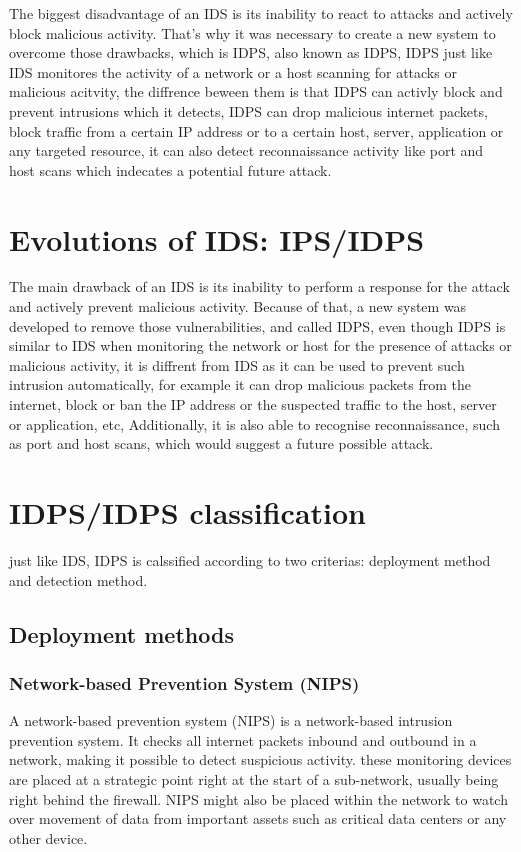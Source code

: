 The biggest disadvantage of an IDS is its inability to react to attacks and actively block malicious activity. That's why it was necessary to create a new system to overcome those drawbacks, which is IDPS, also known as IDPS, IDPS just like IDS monitores the activity of a network or a host scanning for attacks or malicious acitvity, the diffrence beween them is that IDPS can activly block and prevent intrusions which it detects, IDPS can drop malicious internet packets, block traffic from a certain IP address or to a certain host, server, application or any targeted resource, it can also detect reconnaissance activity like port and host scans which indecates a potential future attack.

\section{Evolutions of IDS: IPS/IDPS}
The main drawback of an IDS is its inability to perform a response for the attack and actively prevent malicious activity. Because of that, a new system was developed to remove those vulnerabilities, and called IDPS, even though IDPS is similar to IDS when monitoring the network or host for the presence of attacks or malicious activity, it is diffrent from IDS as it can be used to prevent such intrusion automatically, for example it can drop malicious packets from the internet, block or ban the IP address or the suspected traffic to the host, server or application, etc, Additionally, it is also able to recognise reconnaissance, such as port and host scans, which would suggest a future possible attack. \cite{NIST-IDPS}



\section{IDPS/IDPS classification}
just like IDS, IDPS is calssified according to two criterias: deployment method and detection method.

\subsection{Deployment methods}
\subsubsection{Network-based Prevention System (NIPS)}
A network-based prevention system (NIPS) is a network-based intrusion prevention system. It checks all internet packets inbound and outbound in a network, making it possible to detect suspicious activity. these monitoring devices are placed at a strategic point right at the start of a sub-network, usually being right behind the firewall. NIPS might also be placed within the network to watch over movement of data from important assets such as critical data centers or any other device. \cite{IBM-IPS}

